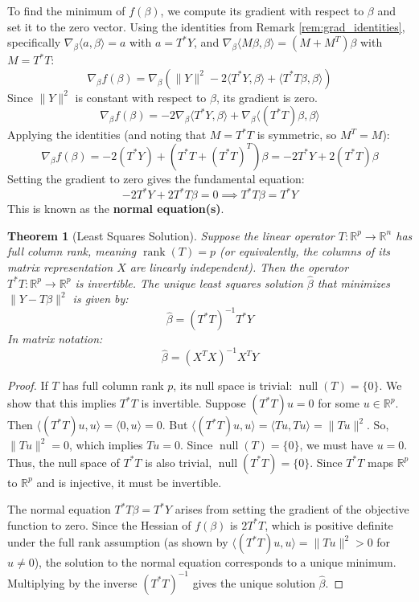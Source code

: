 \documentclass[11pt]{article}
\newtheorem{theorem}{Theorem}[section]
\theoremstyle{definition}
\theoremstyle{remark}
\newcommand{\R}{\mathbb{R}} %
\newcommand{\norm}[1]{\|#1\|} %
\newcommand{\inner}[2]{\langle #1, #2 \rangle} %
\DeclareMathOperator{\rank}{rank} %
\DeclareMathOperator{\nullspace}{null} %
\begin{document}
To find the minimum of $f(\beta)$, we compute its gradient with respect to $\beta$ and set it to the zero vector. Using the identities from Remark \ref{rem:grad_identities}, specifically $\nabla_\beta \inner{a}{\beta} = a$ with $a = T^*Y$, and $\nabla_\beta \inner{M\beta}{\beta} = (M+M^T)\beta$ with $M = T^*T$:
\[
\nabla_\beta f(\beta) = \nabla_\beta (\norm{Y}^2 - 2 \inner{T^* Y}{\beta} + \inner{T^* T \beta}{\beta})
\]
Since $\norm{Y}^2$ is constant with respect to $\beta$, its gradient is zero.
\[
\nabla_\beta f(\beta) = -2 \nabla_\beta \inner{T^* Y}{\beta} + \nabla_\beta \inner{(T^* T) \beta}{\beta}
\]
Applying the identities (and noting that $M=T^*T$ is symmetric, so $M^T=M$):
\[
\nabla_\beta f(\beta) = -2 (T^* Y) + (T^*T + (T^*T)^T) \beta = -2 T^* Y + 2 (T^* T) \beta
\]
Setting the gradient to zero gives the fundamental equation:
\[
-2 T^* Y + 2 T^* T \beta = 0 \implies T^* T \beta = T^* Y
\]
This is known as the \textbf{normal equation(s)}.

\begin{theorem}[Least Squares Solution]
Suppose the linear operator $T: \R^p \to \R^n$ has full column rank, meaning $\rank(T) = p$ (or equivalently, the columns of its matrix representation $X$ are linearly independent). Then the operator $T^* T: \R^p \to \R^p$ is invertible. The unique least squares solution $\hat{\beta}$ that minimizes $\norm{Y - T\beta}^2$ is given by:
\[
\hat{\beta} = (T^* T)^{-1} T^* Y
\]
In matrix notation:
\[
\hat{\beta} = (X^T X)^{-1} X^T Y
\]
\end{theorem}

\begin{proof}
If $T$ has full column rank $p$, its null space is trivial: $\nullspace(T) = \{0\}$. We show that this implies $T^* T$ is invertible. Suppose $(T^* T)u = 0$ for some $u \in \R^p$. Then $\inner{(T^* T)u}{u} = \inner{0}{u} = 0$. But $\inner{(T^* T)u}{u} = \inner{Tu}{Tu} = \norm{Tu}^2$. So, $\norm{Tu}^2 = 0$, which implies $Tu = 0$. Since $\nullspace(T) = \{0\}$, we must have $u = 0$. Thus, the null space of $T^* T$ is also trivial, $\nullspace(T^* T) = \{0\}$. Since $T^* T$ maps $\R^p$ to $\R^p$ and is injective, it must be invertible.

The normal equation $T^* T \beta = T^* Y$ arises from setting the gradient of the objective function to zero. Since the Hessian of $f(\beta)$ is $2 T^* T$, which is positive definite under the full rank assumption (as shown by $\inner{(T^* T)u}{u} = \norm{Tu}^2 > 0$ for $u \neq 0$), the solution to the normal equation corresponds to a unique minimum. Multiplying by the inverse $(T^* T)^{-1}$ gives the unique solution $\hat{\beta}$.
\end{proof}
\end{document}
